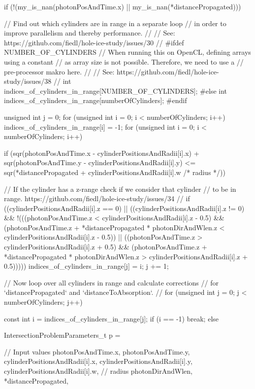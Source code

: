 \begin{ccode}
{  if (!(my_is_nan(photonPosAndTime.x) || my_is_nan(*distancePropagated))) {

    // Find out which cylinders are in range in a separate loop
    // in order to improve parallelism and thereby performance.
    //
    // See: https://github.com/fiedl/hole-ice-study/issues/30
    //
    #ifdef NUMBER_OF_CYLINDERS
      // When running this on OpenCL, defining arrays using a constant
      // as array size is not possible. Therefore, we need to use a
      // pre-processor makro here.
      //
      // See: https://github.com/fiedl/hole-ice-study/issues/38
      //
      int indices_of_cylinders_in_range[NUMBER_OF_CYLINDERS];
    #else
      int indices_of_cylinders_in_range[numberOfCylinders];
    #endif
    {
      unsigned int j = 0;
      for (unsigned int i = 0; i < numberOfCylinders; i++) {
        indices_of_cylinders_in_range[i] = -1;
      }
      for (unsigned int i = 0; i < numberOfCylinders; i++) {
        if (sqr(photonPosAndTime.x - cylinderPositionsAndRadii[i].x) +
            sqr(photonPosAndTime.y - cylinderPositionsAndRadii[i].y) <=
            sqr(*distancePropagated + cylinderPositionsAndRadii[i].w /* radius */))
        {

          // If the cylinder has a z-range check if we consider that cylinder
          // to be in range. https://github.com/fiedl/hole-ice-study/issues/34
          //
          if ((cylinderPositionsAndRadii[i].z == 0) || ((cylinderPositionsAndRadii[i].z != 0) && !(((photonPosAndTime.z < cylinderPositionsAndRadii[i].z - 0.5) && (photonPosAndTime.z + *distancePropagated * photonDirAndWlen.z < cylinderPositionsAndRadii[i].z - 0.5)) || ((photonPosAndTime.z > cylinderPositionsAndRadii[i].z + 0.5) && (photonPosAndTime.z + *distancePropagated * photonDirAndWlen.z > cylinderPositionsAndRadii[i].z + 0.5)))))
          {
            indices_of_cylinders_in_range[j] = i;
            j += 1;
          }
        }
      }
    }

    // Now loop over all cylinders in range and calculate corrections
    // for `distancePropagated` and `distanceToAbsorption`.
    //
    for (unsigned int j = 0; j < numberOfCylinders; j++) {
      const int i = indices_of_cylinders_in_range[j];
      if (i == -1) {
        break;
      } else {

        IntersectionProblemParameters_t p = {

          // Input values
          photonPosAndTime.x,
          photonPosAndTime.y,
          cylinderPositionsAndRadii[i].x,
          cylinderPositionsAndRadii[i].y,
          cylinderPositionsAndRadii[i].w, // radius
          photonDirAndWlen,
          *distancePropagated,

}}}}}
\end{ccode}
